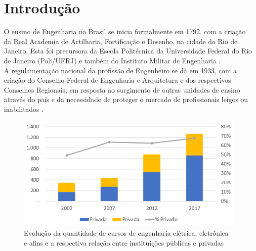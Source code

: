 \chapter{Introdução} \label{ch:intro}

	O ensino de Engenharia no Brasil se inicia formalmente em 1792, com a criação da Real Academia de Artilharia, Fortificação e Desenho, na cidade do Rio de Janeiro. Esta foi precursora da Escola Politécnica da Universidade Federal do Rio de Janeiro (Poli/UFRJ) e também do Instituto Militar de Engenharia \cite{surgimento_engenharia_brasil}.\\
	
	
	A regulamentação nacional da profissão de Engenheiro se dá em 1933, com a criação do Conselho Federal de Engenharia e Arquitetura e dos respectivos Conselhos Regionais, em resposta ao surgimento de outras unidades de ensino através do país e da necessidade de proteger o mercado de profissionais leigos ou inabilitados \cite{historia-confea}.\\
	
	\begin{figure}[h!]
		\centering
		\includegraphics[width=0.8\linewidth]{Figuras/evolucao_cursos_engenharias}
		\caption[Evolução da quantidade de cursos de engenharia elétrica, eletrônica e afins]{Evolução da quantidade de cursos de engenharia elétrica, eletrônica e afins e a respectiva relação entre instituições públicas e privadas \cite{censo_educacao_superior}}
		\label{fig:evolucaocursosengenharias}
	\end{figure}
	
